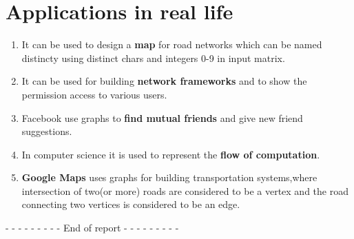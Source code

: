 \documentclass[12pt]{article}
\begin{document}
\section{Applications in real life}
\begin{enumerate}
\item{It can be used to design a \textbf{map} for road networks which can be named distincty using distinct chars and integers 0-9 in input matrix.}
\item{It can be used for building \textbf{network frameworks} and to show the permission access to various users.}
\item{Facebook use graphs to \textbf{find mutual friends} and give new friend suggestions. }
\item{In computer science it is used to represent the \textbf{flow of computation}.}
\item{\textbf{Google Maps} uses graphs for building transportation systems,where intersection of two(or more) roads are considered to be a vertex and the road connecting two vertices is considered to be an edge.}
\end{enumerate}
\quad
\quad
\begin{center}
\quad
\quad
- - - - - - - - - End of report - - - - - - - - -
\end{center}

%
%
\end{document}
